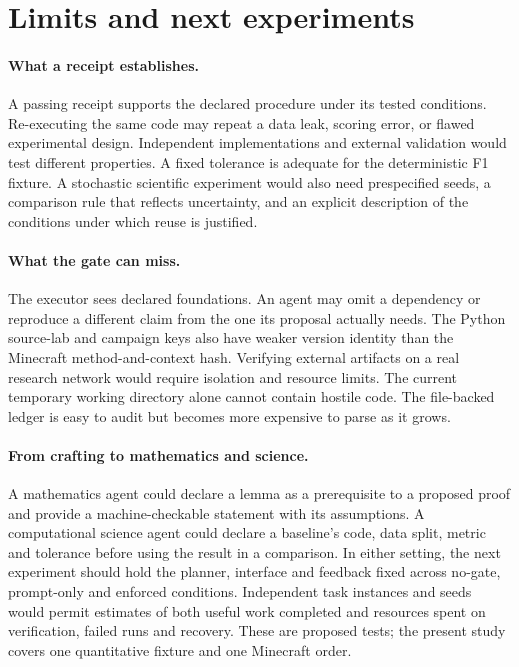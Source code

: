 \documentclass{article}
\begin{document}
\section{Limits and next experiments}

\paragraph{What a receipt establishes.}
A passing receipt supports the declared procedure under its tested conditions. Re-executing the same code may repeat a data leak, scoring error, or flawed experimental design. Independent implementations and external validation would test different properties. A fixed tolerance is adequate for the deterministic F1 fixture. A stochastic scientific experiment would also need prespecified seeds, a comparison rule that reflects uncertainty, and an explicit description of the conditions under which reuse is justified.

\paragraph{What the gate can miss.}
The executor sees declared foundations. An agent may omit a dependency or reproduce a different claim from the one its proposal actually needs. The Python source-lab and campaign keys also have weaker version identity than the Minecraft method-and-context hash. Verifying external artifacts on a real research network would require isolation and resource limits. The current temporary working directory alone cannot contain hostile code. The file-backed ledger is easy to audit but becomes more expensive to parse as it grows.

\paragraph{From crafting to mathematics and science.}
A mathematics agent could declare a lemma as a prerequisite to a proposed proof and provide a machine-checkable statement with its assumptions. A computational science agent could declare a baseline's code, data split, metric and tolerance before using the result in a comparison. In either setting, the next experiment should hold the planner, interface and feedback fixed across no-gate, prompt-only and enforced conditions. Independent task instances and seeds would permit estimates of both useful work completed and resources spent on verification, failed runs and recovery. These are proposed tests; the present study covers one quantitative fixture and one Minecraft order.
\end{document}
